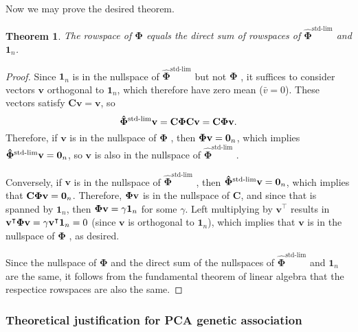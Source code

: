 \documentclass[11pt]{article}
\newcommand{\kinMat}{%
  \ensuremath{%
    \mathbf{\Phi}
  }%
  \xspace%
}%
\newcommand{\kinMatStdLim}{%
  \ensuremath{%
    \mathbf{\hat{\Phi}}^\text{std-lim}
  }%
  \xspace%
}%
\newtheorem*{thm}{Theorem}
\begin{document}
Now we may prove the desired theorem.

\begin{thm}
  The rowspace of \kinMat equals the direct sum of rowspaces of \kinMatStdLim and $\mathbf{1}_n$.
\end{thm}

\begin{proof}
  Since $\mathbf{1}_n$ is in the nullspace of \kinMatStdLim but not \kinMat, it suffices to consider vectors $\mathbf{v}$ orthogonal to $\mathbf{1}_n$, which therefore have zero mean ($\bar{v}=0$).
  These vectors satisfy $\mathbf{C} \mathbf{v} = \mathbf{v}$, so
  $$
  \kinMatStdLim \mathbf{v}
  =
  \mathbf{C} \kinMat \mathbf{C} \mathbf{v}
  =
  \mathbf{C} \kinMat \mathbf{v}
  .
  $$
  Therefore, if $\mathbf{v}$ is in the nullspace of \kinMat, then $\kinMat \mathbf{v} = \mathbf{0}_n$, which implies $\kinMatStdLim \mathbf{v} = \mathbf{0}_n$, so $\mathbf{v}$ is also in the nullspace of \kinMatStdLim.
  
  Conversely, if $\mathbf{v}$ is in the nullspace of \kinMatStdLim, then $\kinMatStdLim \mathbf{v} = \mathbf{0}_n$, which implies that $\mathbf{C} \kinMat \mathbf{v} = \mathbf{0}_n$.
  Therefore, $\kinMat \mathbf{v}$ is in the nullspace of $\mathbf{C}$, and since that is spanned by $\mathbf{1}_n$, then $\kinMat \mathbf{v} = \gamma \mathbf{1}_n$ for some $\gamma$.
  Left multiplying by $\mathbf{v}^\intercal$ results in $\mathbf{v}^\intercal \kinMat \mathbf{v} = \gamma \mathbf{v}^\intercal \mathbf{1}_n = 0$ (since $\mathbf{v}$ is orthogonal to $\mathbf{1}_n$), which implies that $\mathbf{v}$ is in the nullspace of \kinMat, as desired.

  Since the nullspace of \kinMat and the direct sum of the nullspaces of \kinMatStdLim and $\mathbf{1}_n$ are the same, it follows from the fundamental theorem of linear algebra that the respectice rowspaces are also the same.
\end{proof}

\subsubsection{Theoretical justification for PCA genetic association}
\end{document}
